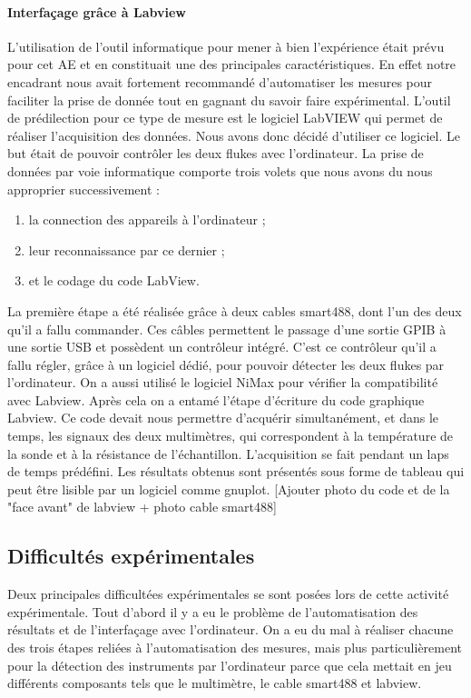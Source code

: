 \paragraph{Interfaçage grâce à Labview}
L'utilisation de l'outil informatique pour mener à bien l'expérience était prévu pour cet AE 
et en constituait une des principales caractéristiques. En effet notre encadrant nous avait fortement recommandé 
d'automatiser les mesures pour faciliter la prise de donnée tout en gagnant du savoir faire expérimental. L'outil de 
prédilection pour ce type de mesure est le logiciel LabVIEW qui permet de réaliser l'acquisition des données. 
Nous avons donc décidé d'utiliser ce logiciel. Le but était de pouvoir contrôler les deux flukes avec l'ordinateur. 
La prise de données par voie informatique comporte trois volets que nous avons du nous approprier successivement : 

\begin{enumerate}
\item la connection des appareils à l'ordinateur ; 
\item leur reconnaissance par ce dernier ; 
\item et le codage du code LabView. 
\end{enumerate}

La première étape a été réalisée grâce à deux cables smart488, dont l'un des deux qu'il a fallu commander. 
Ces câbles permettent le passage d'une sortie GPIB à une sortie USB et possèdent un contrôleur intégré. 
C'est ce contrôleur qu'il a fallu régler, grâce à un logiciel dédié, pour pouvoir détecter les deux flukes 
par l'ordinateur. On a aussi utilisé le logiciel NiMax pour vérifier la compatibilité avec Labview. 
Après cela on a entamé l'étape d'écriture du code graphique Labview. Ce code devait nous permettre d'acquérir 
simultanément, et dans le temps, les signaux des deux multimètres, qui correspondent à la température de la sonde 
et à la résistance de l'échantillon. L'acquisition se fait pendant un laps de temps prédéfini. Les résultats obtenus sont présentés sous forme de tableau qui peut être lisible par un logiciel comme gnuplot.
[Ajouter photo du code et de la "face avant" de labview + photo cable smart488]


\subsection{Difficultés expérimentales}
Deux principales difficultées expérimentales se sont posées lors de cette activité expérimentale. 
Tout d'abord il y a eu le problème de l'automatisation des résultats et de l'interfaçage avec l'ordinateur.
On a eu du mal à réaliser chacune des trois étapes reliées à l'automatisation des mesures, mais plus particulièrement 
pour la détection des instruments par l'ordinateur parce que cela mettait en jeu différents composants tels que le 
multimètre, le cable smart488 et labview.

